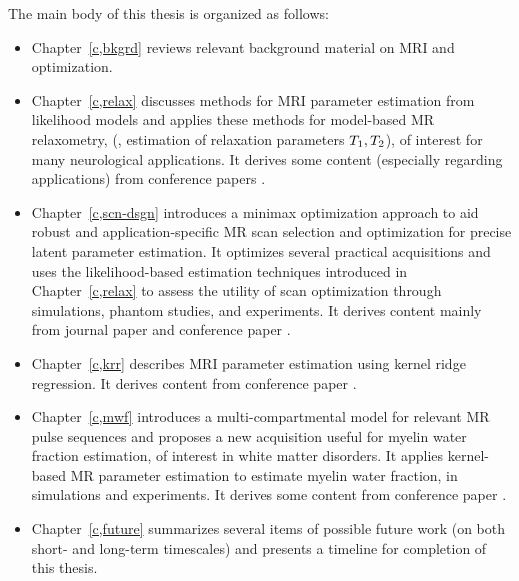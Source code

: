 The main body of this thesis is organized as follows:
\begin{itemize}
\item 
	Chapter~\ref{c,bkgrd} reviews 
	relevant background material
	on MRI and optimization.
\item 
	Chapter~\ref{c,relax} discusses methods 
	for MRI parameter estimation 
	from likelihood models 
	and applies these methods 
	for model-based MR relaxometry, 
	(\ie, estimation of relaxation parameters $T_1,T_2$),
	of interest for many neurological applications.
	It derives some content 
	(especially regarding applications)
	from conference papers 
	\cite{nataraj:14:rje,nataraj:14:mbe}.
\item
	Chapter~\ref{c,scn-dsgn} introduces
	a minimax optimization approach
	to aid robust and application-specific 
	MR scan selection and optimization 
	for precise latent parameter estimation.
	It optimizes several practical acquisitions 
	and uses the likelihood-based estimation techniques 
	introduced in Chapter~\ref{c,relax}
	to assess the utility
	of scan optimization
	through simulations, 
	phantom studies, 
	and \invivo experiments.
	It derives content
	mainly from journal paper
	\cite{nataraj::oms}
	and conference paper
	\cite{nataraj:15:amm}.
\item 
	Chapter~\ref{c,krr} describes 
	MRI parameter estimation
	using kernel ridge regression.
	It derives content 
	from conference paper
	\cite{nataraj:17:dfm}.
\item
	Chapter~\ref{c,mwf} introduces a multi-compartmental model
	for relevant MR pulse sequences
	and proposes a new acquisition 
	useful for myelin water fraction estimation,
	of interest in white matter disorders.
	It applies kernel-based MR parameter estimation
	to estimate myelin water fraction,
	in simulations and \invivo experiments.
	It derives some content from conference paper
	\cite{nataraj:17:mwf}.
\begin{comment}
\item
	Chapter~\ref{c,ss-rf} presents
	some relatively immature ideas
	on steady-state radiofrequency (RF) pulse design
	as well as associated challenges.
	This work is presently unpublished
	and may offer avenues for further research.
\end{comment}
\item 
	Chapter~\ref{c,future} summarizes several items 
	of possible future work
	(on both short- and long-term timescales) 
	and presents a timeline
	for completion of this thesis.
\end{itemize}

